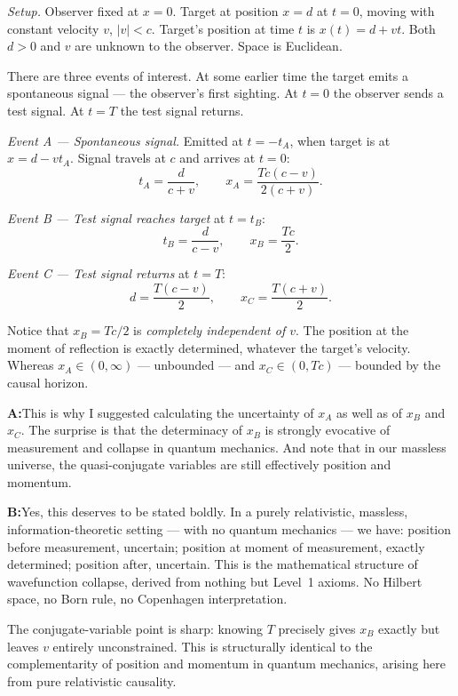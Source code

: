 \documentclass[11pt]{article}
\newcommand{\A}{\medskip\noindent\textbf{A:}\quad}
\newcommand{\B}{\medskip\noindent\textbf{B:}\quad}
\begin{document}
\medskip\noindent
\textit{Setup.} Observer fixed at $x = 0$. Target at position $x = d$
at $t = 0$, moving with constant velocity $v$, $|v| < c$. Target's
position at time $t$ is $x(t) = d + vt$. Both $d > 0$ and $v$ are
unknown to the observer. Space is Euclidean.

There are three events of interest. At some earlier time the target
emits a spontaneous signal --- the observer's first sighting. At
$t = 0$ the observer sends a test signal. At $t = T$ the test signal
returns.

\medskip\noindent
\textit{Event A --- Spontaneous signal.} Emitted at $t = -t_A$, when
target is at $x = d - vt_A$. Signal travels at $c$ and arrives at
$t = 0$:
\[
t_A = \frac{d}{c + v}, \qquad x_A = \frac{Tc(c-v)}{2(c+v)}.
\]

\noindent\textit{Event B --- Test signal reaches target} at $t = t_B$:
\[
t_B = \frac{d}{c - v}, \qquad x_B = \frac{Tc}{2}.
\]

\noindent\textit{Event C --- Test signal returns} at $t = T$:
\[
d = \frac{T(c-v)}{2}, \qquad x_C = \frac{T(c+v)}{2}.
\]

Notice that $x_B = Tc/2$ is \emph{completely independent of $v$}. The
position at the moment of reflection is exactly determined, whatever
the target's velocity. Whereas $x_A \in (0, \infty)$ --- unbounded
--- and $x_C \in (0, Tc)$ --- bounded by the causal horizon.

\A This is why I suggested calculating the uncertainty of $x_A$ as
well as of $x_B$ and $x_C$. The surprise is that the determinacy of
$x_B$ is strongly evocative of measurement and collapse in quantum
mechanics. And note that in our massless universe, the quasi-conjugate
variables are still effectively position and momentum.

\B Yes, this deserves to be stated boldly. In a purely relativistic,
massless, information-theoretic setting --- with no quantum mechanics
--- we have: position before measurement, uncertain; position at
moment of measurement, exactly determined; position after, uncertain.
This is the mathematical structure of wavefunction collapse, derived
from nothing but Level~1 axioms. No Hilbert space, no Born rule, no
Copenhagen interpretation.

The conjugate-variable point is sharp: knowing $T$ precisely gives
$x_B$ exactly but leaves $v$ entirely unconstrained. This is
structurally identical to the complementarity of position and momentum
in quantum mechanics, arising here from pure relativistic causality.
\end{document}
